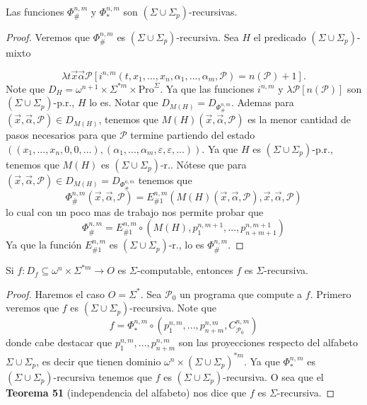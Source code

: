   \begin{theorem}
    Las funciones $\Phi _{\#}^{n,m}$ y $\Phi _{\ast }^{n,m}$ son $(\Sigma \cup \Sigma _{p})$-recursivas.

  \begin{proof}
    Veremos que $\Phi _{\#}^{n,m}$ es $(\Sigma \cup \Sigma _{p})$-recursiva. Sea $H$ el predicado
    $(\Sigma \cup \Sigma _{p})$-mixto

    \[
      \displaystyle \lambda t\vec{x}\vec{\alpha}\mathcal{P}\left[ i^{n,m}(t,x_{1},...,x_{n}, \alpha _{1},...,\alpha _{m},
      \mathcal{P})=n(\mathcal{P})+1\right] \text{.}
    \]
    Note que $D_{H}=\omega ^{n+1}\times \Sigma ^{\ast m}\times \mathrm{Pro} ^{\Sigma }$.
    Ya que las funciones $i^{n,m}$ y $\lambda \mathcal{P}\left[ n( \mathcal{P})\right] $ son
    $(\Sigma \cup \Sigma _{p})$-p.r., $H$ lo es. Notar que $D_{M(H)}=D_{\Phi _{\#}^{n,m}}$.
    Ademas para $(\vec{x},\vec{\alpha}, \mathcal{P})\in D_{M(H)}$, tenemos que $M(H)(\vec{x},\vec{\alpha},
    \mathcal{P} )$ es la menor cantidad de pasos necesarios para que $\mathcal{P}$ termine partiendo del estado
    $((x_{1},...,x_{n},0,0,...),(\alpha _{1},...,\alpha _{m},\varepsilon ,\varepsilon ,...))$.
    Ya que $H$ es $(\Sigma \cup \Sigma _{p})$-p.r., tenemos que $M(H)$ es $(\Sigma \cup \Sigma _{p})$-r..
    Nótese que para $(\vec{x},\vec{\alpha},\mathcal{P})\in D_{M(H)}=D_{\Phi _{\#}^{n,m}} $ tenemos que
    \[
      \displaystyle \Phi _{\#}^{n,m}(\vec{x},\vec{\alpha},\mathcal{P})=E_{\#1}^{n,m}\left( M(H)( \vec{x},\vec{\alpha},
      \mathcal{P}),\vec{x},\vec{\alpha},\mathcal{P}\right)
    \]
    lo cual con un poco mas de trabajo nos permite probar que %
    \[
      \displaystyle \Phi _{\#}^{n,m}=E_{\#1}^{n,m}\circ \left( M(H),p_{1}^{n,m+1},...,p_{n+m+1}^{n,m+1}\right)
    \]
    Ya que la función $E_{\#1}^{n,m}$ es $(\Sigma \cup \Sigma _{p})$-r., lo es $ \Phi _{\#}^{n,m}$.
  \end{proof}
  \end{theorem}


  \begin{corollary}
    Si $f:D_{f}\subseteq \omega ^{n}\times \Sigma ^{\ast m}\rightarrow O$ es $ \Sigma $-computable,
    entonces $f$ es $\Sigma $-recursiva.
  \begin{proof}
    Haremos el caso $O=\Sigma ^{\ast }$. Sea $\mathcal{P}_{0}$ un programa que compute a $f$.
    Primero veremos que $f$ es $(\Sigma \cup \Sigma _{p})$-recursiva. Note que
    \[
      \displaystyle f=\Phi _{\ast }^{n,m}\circ \left( p_{1}^{n,m},...,p_{n+m}^{n,m},C_{\mathcal{P }_{0}}^{n,m}\right)
    \]
    donde cabe destacar que $p_{1}^{n,m},...,p_{n+m}^{n,m}$ son las proyecciones respecto del alfabeto
    $\Sigma \cup \Sigma _{p}$, es decir que tienen dominio $\omega ^{n}\times (\Sigma \cup \Sigma _{p})^{\ast m}$.
    Ya que $\Phi _{\ast }^{n,m}$ es $(\Sigma \cup \Sigma _{p})$-recursiva tenemos que $f$ es
    $(\Sigma \cup \Sigma _{p})$-recursiva.
    O sea que el \textbf{Teorema 51} (independencia del alfabeto) nos dice que $f$ es $\Sigma $-recursiva.
  \end{proof}
  \end{corollary}


